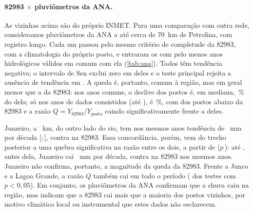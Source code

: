 \documentclass[11pt,a4paper]{article}
\newcommand{\IC}[2]{[#1;\,#2]}            %
\newcommand{\Est}{82983}
\begin{document}
\paragraph{\Est{} \texorpdfstring{$\times$}{x} pluviômetros da ANA.}
As vizinhas acima são do próprio INMET. Para uma comparação com outra rede, consideramos
\NPostosAnaCandidatos{} pluviômetros da ANA a até cerca de 70~km de Petrolina, com registro longo. Cada
um passou pelo mesmo critério de completude da \Est{}, com a climatologia do próprio posto, e entraram
os \NPostosAna{} com pelo menos \MinComumAna{} anos hidrológicos válidos em comum com ela
(\cref{tab:ana}). Todos têm tendência negativa; o intervalo de Sen exclui zero em \NAnaNegSig{} deles e
o teste principal rejeita a ausência de tendência em \NAnaNegSigTeste{}. A queda é, portanto, comum à
região, mas em geral menor que a da \Est{}: nos anos comuns, o declive dos postos é, em mediana,
\RazaoSenAnaMediana{}\,\% do dela; só nos anos de dados consistidos (até \UltimoAnoConsAna{}), é
\RazaoSenAnaConsMediana{}\,\%, com \NAnaConsMenor{} dos \NAnaCons{} postos abaixo da \Est{} e a razão
$Q = Y_{\Est}/Y_{\text{posto}}$ caindo significativamente frente a \NAnaConsQSig{} deles.

Juazeiro, a \DistJuazeiro{}~km, do outro lado do rio, tem nos mesmos \NComumJuazeiro{} anos tendência de
\SenAnaJuazeiro{}~mm por década \IC{\SenAnaJuazeiroICinf}{\SenAnaJuazeiroICsup}, contra
\SenRefJuazeiro{} na \Est{}. Essa concordância, porém, vem do trecho posterior a uma quebra
significativa na razão entre os dois, a partir de \QuebraAnaJuazeiro{} ($p$\,\PSnhtAnaJuazeiro): até
\AnoAntesQuebraAnaJuazeiro{}, antes dela, Juazeiro cai \SenAnaAteOnzeJuazeiro{}~mm por década, contra
\SenRefAteOnzeJuazeiro{} na \Est{} nos mesmos \NComumAteOnzeJuazeiro{} anos. Juazeiro não confirma, portanto, a magnitude da queda da
\Est{}. Frente a Junco e a Lagoa Grande, a razão $Q$ também cai em todo o período (\NAnaQSig{} dos
\NPostosAna{} testes com $p<0{,}05$). Em conjunto, os pluviômetros da ANA confirmam que a chuva caiu na
região, mas indicam que a \Est{} cai mais que a maioria dos postos vizinhos, por motivo climático local
ou instrumental que estes dados não esclarecem.
\end{document}
